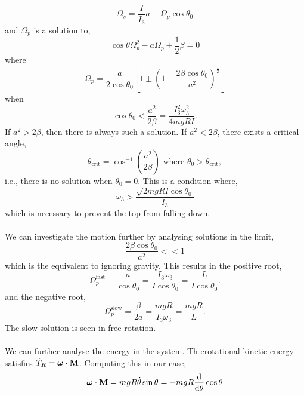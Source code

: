 \documentclass{book}
\begin{document}
\begin{equation}
	\Omega_s = \frac{I}{I_3}a - \Omega_p\cos\theta_0
\end{equation}
and $\Omega_p$ is a solution to,
\begin{equation}
	\cos\theta \Omega_p^2 - a\Omega_p + \frac{1}{2}\beta = 0
\end{equation}
where 
\begin{equation}
	\Omega_p = \frac{a}{2\cos\theta_0}\left[1\pm\left(1 - \frac{2\beta\cos\theta_0}{a^2}\right)^{\frac{1}{2}}\right]
\end{equation}
when
\begin{equation}
	\cos\theta_0 < \frac{a^2}{2\beta} = \frac{I_3^2\omega_3^2}{4mgRI}.
\end{equation}
If $a^2 > 2\beta$, then there is always such a solution. If $a^2 < 2\beta$, there exists a critical angle,
\begin{equation}
	\theta_{\text{crit}} = \cos^{-1}\left(\frac{a^2}{2\beta}\right)\text{ where } \theta_0 > \theta_{\text{crit}},
\end{equation}
i.e., there is no solution when $\theta_0 = 0$. This is a condition where,
\begin{equation}
	\omega_3 > \frac{\sqrt{2mgRI\cos\theta_0}}{I_3}\label{condition}
\end{equation}
which is necessary to prevent the top from falling down.
\\\\
We can investigate the motion further by analysing solutions in the limit,
\begin{equation}
	\frac{2\beta \cos\theta_0}{a^2} << 1
\end{equation}
which is the equivalent to ignoring gravity. This results in the positive root,
\begin{equation}
	\Omega_p^{\text{fast}} - \frac{a}{\cos\theta_0} = \frac{I_3\omega_3}{I\cos\theta_0} = \frac{L}{I\cos\theta_0}.
\end{equation}
and the negative root,
\begin{equation}
	\Omega_p^{\text{slow}}=\frac{\beta}{2a} = \frac{mgR}{I_3\omega_3} = \frac{mgR}{L}.
\end{equation}
The slow solution is seen in free rotation.
\\\\
We can further analyse the energy in the system. Th erotational kinetic energy satisfies $\Dot{T}_R = \vb*{\omega}\cdot\vb{M}$. Computing this in our case,
\begin{equation}
	\vb*{\omega}\cdot{\vb{M}} = mgR\Dot{\theta}\sin\theta = -mgR\dv{}{\theta}\cos\theta
\end{equation}
\end{document}
